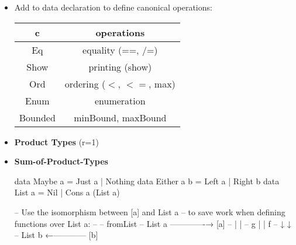 \begin{itemize}
  \item Add  to data declaration to define canonical operations: 
\begin{center}\begin{tabular}{|c|c|}\hline
  \rowcolor{grau} c       & operations                          \\\hline
                  Eq      & equality (==, /=)                   \\\hline
                  Show    & printing (show)                     \\\hline
                  Ord     & ordering ($<$, $<=$, max)               \\\hline
                  Enum    & enumeration                         \\\hline
                  Bounded & minBound, maxBound                  \\\hline
  \end{tabular}\end{center}
  \item \textbf{Product Types} (r=1)\\
  \item \textbf{Sum-of-Product-Types}\\
\begin{Haskell}
data Maybe a = Just a | Nothing
data Either a b = Left a | Right b
data List a = Nil | Cons a (List a)
\end{Haskell}


\begin{Haskell}
-- Use the isomorphism between [a] and List a
-- to save work when defining functions over List a:
--
--                 fromList
--       List a -------------→ [a]
--         |                    |
--       g |                    | f
--         ↓                    ↓
--       List b ←------------ [b]
\end{Haskell}

        
\end{itemize}
